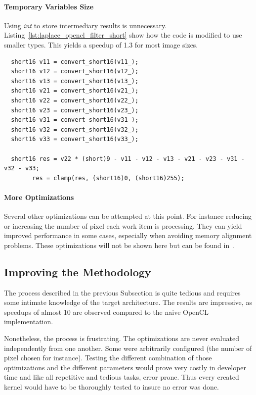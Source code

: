 \documentclass[11pt, a4paper, twoside]{montblanc}
\begin{document}
\paragraph{Temporary Variables Size} Using \textit{int} to store intermediary
results is unnecessary. Listing~\ref{lst:laplace_opencl_filter_short} show how
the code is modified to use smaller types. This yields a speedup of 1.3 for most
image sizes.

\begin{lstlisting}
  short16 v11 = convert_short16(v11_);
  short16 v12 = convert_short16(v12_);
  short16 v13 = convert_short16(v13_);
  short16 v21 = convert_short16(v21_);
  short16 v22 = convert_short16(v22_);
  short16 v23 = convert_short16(v23_);
  short16 v31 = convert_short16(v31_);
  short16 v32 = convert_short16(v32_);
  short16 v33 = convert_short16(v33_);

  short16 res = v22 * (short)9 - v11 - v12 - v13 - v21 - v23 - v31 - v32 - v33;
        res = clamp(res, (short16)0, (short16)255);
\end{lstlisting}

\paragraph{More Optimizations} Several other optimizations can be attempted at
this point. For instance reducing or increasing the number of pixel each work
item is processing. They can yield improved performance in some cases, especially
when avoiding memory alignment problems. These optimizations will not be shown
here but can be found in~\cite{opencl_arm_training}.

\subsection{Improving the Methodology}

The process described in the previous Subsection is quite tedious and requires
some intimate knowledge of the target architecture. The results are impressive,
as speedups of almost 10 are observed compared to the naive OpenCL
implementation.

Nonetheless, the process is frustrating. The optimizations are never evaluated
independently from one another. Some were arbitrarily configured (the number of
pixel chosen for instance). Testing the different combination of those
optimizations and the different parameters would prove very costly in developer
time and like all repetitive and tedious tasks, error prone. Thus every created
kernel would have to be thoroughly tested to insure no error was done.
\end{document}
